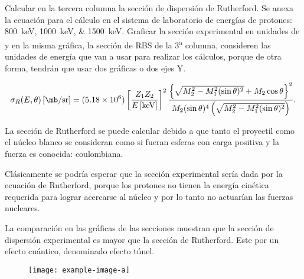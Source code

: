 \documentclass[./../main.tex]{subfiles}
\begin{document}
    \begin{exercise}
        Calcular en la tercera columna la sección de dispersión de Rutherford. Se anexa la ecuación para el cálculo en el sistema de laboratorio de energías de protones: \qtylist[list-units=single]{800;1000;1500}{\keV}. Graficar la sección experimental en unidades de \unit{\mb} y en la misma gráfica, la sección de RBS de la 3\textsuperscript{a} columna, consideren las unidades de energía que van a usar para realizar los cálculos, porque de otra forma, tendrán que usar dos gráficas o dos ejes Y.

        \begin{equation*}
            \sigma_{R}(E, \theta)\left[\unit{\mb\per\steradian}\right] = (\num{5.18e6}) \left[\dfrac{Z_{1}Z_{2}}{E\left[\unit{\keV}\right]}\right]^{2} \dfrac{\left\lbrace\sqrt{M_{2}^{2} - M_{1}^{2}(\sin\theta)^{2}} + M_{2}\cos\theta\right\rbrace^{2}}{M_{2}(\sin\theta)^{4}\left(\sqrt{M_{2}^{2} - M_{1}^{2}(\sin\theta)^{2}}\right)}.
        \end{equation*}

        La sección de Rutherford se puede calcular debido a que tanto el proyectil como el núcleo blanco se consideran como si fueran esferas con carga positiva y la fuerza es conocida: coulombiana.

        Clásicamente se podría esperar que la sección experimental sería dada por la ecuación de Rutherford, porque los protones no tienen la energía cinética requerida para lograr acercarse al núcleo y por lo tanto no actuarían las fuerzas nucleares.

        La comparación en las gráficas de las secciones muestran que la sección de dispersión experimental es mayor que la sección de Rutherford. Este por un efecto cuántico, denominado efecto túnel.

        \begin{figure}[htb]
            \centering
            \texttt{[image: example-image-a]}
        \end{figure}
    \end{exercise}
\end{document}
